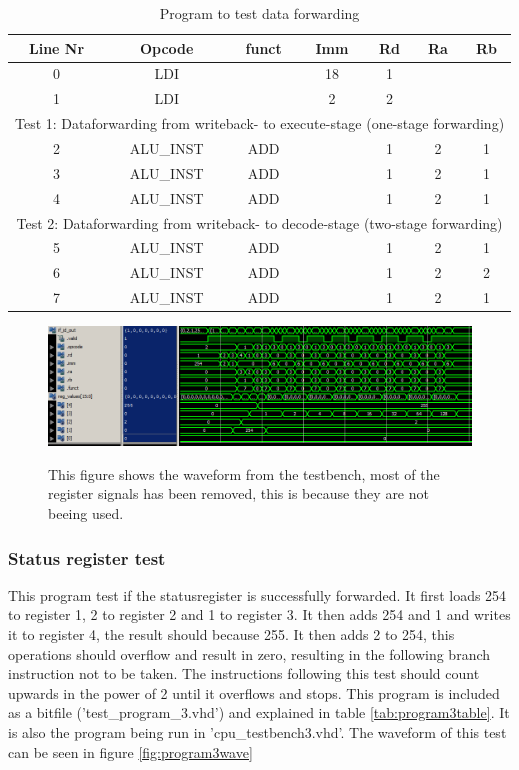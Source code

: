 \documentclass[11pt]{report}
\begin{document}
\begin{table}[htbp]
  \centering
  \begin{tabular}{|c|c|c|c|c|c|c|}
    \hline
    Line Nr &	Opcode		&	funct	&	Imm	&	Rd	&	Ra	&	Rb	\\\hline
    	0	&	LDI			&			&	18	&	1	&		&		\\\hline
    	1	&	LDI			&			&	2	&	2	&		&		\\\hline
	\multicolumn{7}{|c|}{Test 1: Dataforwarding from writeback- to execute-stage (one-stage forwarding)}\\\hline
    	2	&	ALU\_INST	&	ADD		&		&	1	&	2	&	1	\\\hline
    	3	&	ALU\_INST	&	ADD		&		&	1	&	2	&	1	\\\hline
    	4	&	ALU\_INST	&	ADD		&		&	1	&	2	&	1	\\\hline
	\multicolumn{7}{|c|}{Test 2: Dataforwarding from writeback- to decode-stage (two-stage forwarding)}\\\hline
    	5	&	ALU\_INST	&	ADD		&		&	1	&	2	&	1	\\\hline
    	6	&	ALU\_INST	&	ADD		&		&	1	&	2	&	2	\\\hline
    	7	&	ALU\_INST	&	ADD		&		&	1	&	2	&	1	\\\hline
  \end{tabular}
  \caption{Program to test data forwarding}
  \label{tab:program2table}
\end{table}

\begin{figure}
  \centering
  \includegraphics[width=.95\linewidth]{test3.png} \\
  \caption{This figure shows the waveform from the testbench, 
  most of the register signals has been removed, this is because they are not beeing used.}
  \label{fig:program2wave}
\end{figure}

\subsubsection*{Status register test}

This program test if the statusregister is successfully forwarded.
It first loads 254 to register 1, 2 to register 2 and 1 to register 3.
It then adds 254 and 1 and writes it to register 4, the result should because
255. It then adds 2 to 254, this operations should overflow and result in zero,
resulting in the following branch instruction not to be taken. The instructions
following this test should count upwards in the power of 2 until it overflows
and stops. This program is included as a bitfile ('test\_program\_3.vhd') and
explained in table \ref{tab:program3table}. It is also the program being run in 'cpu\_testbench3.vhd'.
The waveform of this test can be seen in figure \ref{fig:program3wave}
\end{document}
